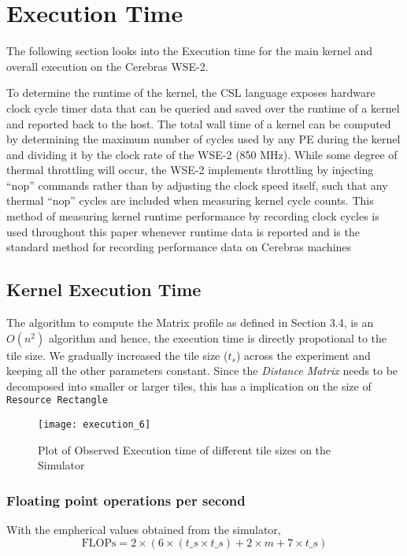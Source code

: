 \section{Execution Time}

The following section looks into the Execution time for the main kernel and overall execution on the Cerebras WSE-2.

To determine the runtime of the kernel, the CSL language exposes hardware clock cycle timer data that can be queried and saved over the runtime of a kernel and reported back to the host. The total wall time of a kernel can be computed by determining the maximum number of cycles used by any PE during the kernel and dividing it by the clock rate of the WSE-2 (850 MHz). While some degree of thermal throttling will occur, the WSE-2 implements
throttling by injecting “nop” commands rather than by adjusting the clock speed
itself, such that any thermal “nop” cycles are included when measuring kernel cycle
counts. This method of measuring kernel runtime performance by recording clock
cycles is used throughout this paper whenever runtime data is reported and is the
standard method for recording performance data on Cerebras machines \cite{9}

\subsection{Kernel Execution Time}
The algorithm to compute the Matrix profile as defined in Section 3.4, is an \(O(n^2)\) algorithm and hence, the execution time is directly propotional to the tile size. We gradually increased the tile size ($t_s$) across the experiment and keeping all the other parameters constant. Since the \textit{Distance Matrix} needs to be decomposed into smaller or larger tiles, this has a implication on the size of \texttt{Resource Rectangle}





\begin{figure}[h!]
    \texttt{[image: execution\_6]}
    \centering
    \caption{Plot of Observed Execution time of different tile sizes on the Simulator}
\end{figure}

\subsubsection{Floating point operations per second}

With the empherical values obtained from the simulator, 
\begin{equation*}
    \text{FLOPs} = 2 \times \left( 6 \times (t\_s \times t\_s) +  2 \times m + 7 \times t\_s\right)
\end{equation*}

